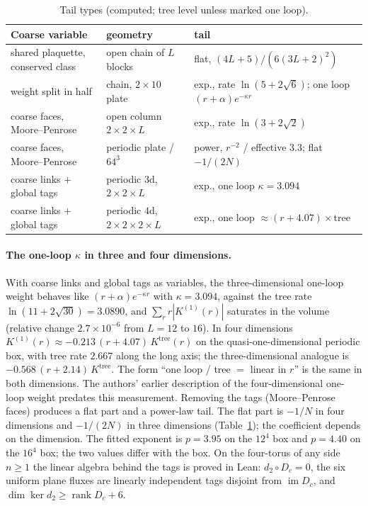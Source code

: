\documentclass[11pt,a4paper]{article}
\theoremstyle{definition}
\theoremstyle{remark}
\newcommand{\im}{\operatorname{im}}
\begin{document}
\begin{table}[h]\centering\small
\caption{Tail types (computed; tree level unless marked one loop).}\label{tab:tails}
\begin{tabular}{@{}p{}p{}p{}@{}}
\toprule
Coarse variable & geometry & tail\\ \midrule
shared plaquette, conserved class & open chain of $L$ blocks & flat, $(4L+5)/(6(3L+2)^2)$\\
weight split in half & chain, $2\times10$ plate & exp., rate $\ln(5+2\sqrt6)$; one loop $(r+\alpha)e^{-\kappa r}$\\
coarse faces, Moore--Penrose & open column $2\times2\times L$ & exp., rate $\ln(3+2\sqrt2)$\\
coarse faces, Moore--Penrose & periodic plate / $64^3$ & power, $r^{-2}$ / effective $3.3$; flat $-1/(2N)$\\
coarse links $+$ global tags & periodic $3$d, $2\times2\times L$ & exp., one loop $\kappa=3.094$\\
coarse links $+$ global tags & periodic $4$d, $2\times2\times2\times L$ & exp., one loop $\approx(r+4.07)\times$tree\\
\bottomrule
\end{tabular}
\end{table}

\paragraph{The one-loop $\kappa$ in three and four dimensions.}
With coarse links and global tags as variables, the three-dimensional one-loop weight behaves like $(r+\alpha)e^{-\kappa r}$ with $\kappa=3.094$, against the tree rate $\ln(11+2\sqrt{30})=3.0890$, and $\sum_rr|K^{(1)}(r)|$ saturates in the volume (relative change $2.7\times10^{-6}$ from $L=12$ to $16$). In four dimensions $K^{(1)}(r)\approx-0.213\,(r+4.07)\,K^{\mathrm{tree}}(r)$ on the quasi-one-dimensional periodic box, with tree rate $2.667$ along the long axis; the three-dimensional analogue is $-0.568\,(r+2.14)\,K^{\mathrm{tree}}$. The form ``one loop / tree $=$ linear in $r$'' is the same in both dimensions. The authors' earlier description of the four-dimensional one-loop weight predates this measurement. Removing the tags (Moore--Penrose faces) produces a flat part and a power-law tail. The flat part is $-1/N$ in four dimensions and $-1/(2N)$ in three dimensions (Table~\ref{tab:tails}); the coefficient depends on the dimension. The fitted exponent is $p=3.95$ on the $12^4$ box and $p=4.40$ on the $16^4$ box; the two values differ with the box.
On the four-torus of any side $n\ge1$ the linear algebra behind the tags is proved in Lean: $d_2\circ D_c=0$, the six uniform plane fluxes are linearly independent tags disjoint from $\im D_c$, and $\dim\ker d_2\ge\operatorname{rank}D_c+6$.
\end{document}
